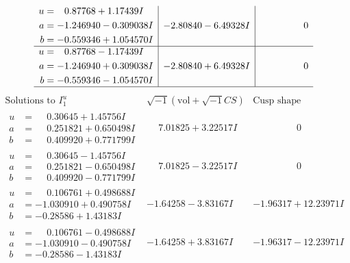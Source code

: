 \documentclass[1p]{elsarticle_modified}
\theoremstyle{definition}
\newcommand{\I}{\sqrt{-1}}
\begin{document}
$$\begin{array}{c|c|c}
\begin{aligned}
u &= \phantom{-}0.87768 + 1.17439 I \\
a &= -1.246940 - 0.309038 I \\
b &= -0.559346 + 1.054570 I\end{aligned}
 & -2.80840 - 6.49328 I & \phantom{-0.000000 } 0 \\ \hline\begin{aligned}
u &= \phantom{-}0.87768 - 1.17439 I \\
a &= -1.246940 + 0.309038 I \\
b &= -0.559346 - 1.054570 I\end{aligned}
 & -2.80840 + 6.49328 I & \phantom{-0.000000 } 0\\
 \hline 
 \end{array}$$\newpage$$\begin{array}{c|c|c}  
\text{Solutions to }I^u_{1}& \I (\text{vol} + \sqrt{-1}CS) & \text{Cusp shape}\\
 \hline 
\begin{aligned}
u &= \phantom{-}0.30645 + 1.45756 I \\
a &= \phantom{-}0.251821 + 0.650498 I \\
b &= \phantom{-}0.409920 + 0.771799 I\end{aligned}
 & \phantom{-}7.01825 + 3.22517 I & \phantom{-0.000000 } 0 \\ \hline\begin{aligned}
u &= \phantom{-}0.30645 - 1.45756 I \\
a &= \phantom{-}0.251821 - 0.650498 I \\
b &= \phantom{-}0.409920 - 0.771799 I\end{aligned}
 & \phantom{-}7.01825 - 3.22517 I & \phantom{-0.000000 } 0 \\ \hline\begin{aligned}
u &= \phantom{-}0.106761 + 0.498688 I \\
a &= -1.030910 + 0.490758 I \\
b &= -0.28586 + 1.43183 I\end{aligned}
 & -1.64258 - 3.83167 I & -1.96317 + 12.23971 I \\ \hline\begin{aligned}
u &= \phantom{-}0.106761 - 0.498688 I \\
a &= -1.030910 - 0.490758 I \\
b &= -0.28586 - 1.43183 I\end{aligned}
 & -1.64258 + 3.83167 I & -1.96317 - 12.23971 I \\ \hline\begin{aligned}

\end{aligned}
\end{array}$$
\end{document}
